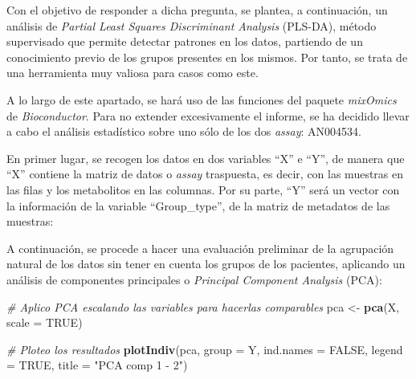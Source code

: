 \documentclass[
]{article}
\newenvironment{Shaded}{\begin{snugshade}}{\end{snugshade}}
\newcommand{\AttributeTok}[1]{\textcolor[rgb]{0.13,0.29,0.53}{#1}}
\newcommand{\CommentTok}[1]{\textcolor[rgb]{0.56,0.35,0.01}{\textit{#1}}}
\newcommand{\ConstantTok}[1]{\textcolor[rgb]{0.56,0.35,0.01}{#1}}
\newcommand{\FunctionTok}[1]{\textcolor[rgb]{0.13,0.29,0.53}{\textbf{#1}}}
\newcommand{\NormalTok}[1]{#1}
\newcommand{\OtherTok}[1]{\textcolor[rgb]{0.56,0.35,0.01}{#1}}
\newcommand{\SpecialCharTok}[1]{\textcolor[rgb]{0.81,0.36,0.00}{\textbf{#1}}}
\newcommand{\StringTok}[1]{\textcolor[rgb]{0.31,0.60,0.02}{#1}}
\begin{document}
Con el objetivo de responder a dicha pregunta, se plantea, a
continuación, un análisis de \emph{Partial Least Squares Discriminant
Analysis} (PLS-DA), método supervisado que permite detectar patrones en
los datos, partiendo de un conocimiento previo de los grupos presentes
en los mismos. Por tanto, se trata de una herramienta muy valiosa para
casos como este.

A lo largo de este apartado, se hará uso de las funciones del paquete
\emph{mixOmics} de \emph{Bioconductor}. Para no extender excesivamente
el informe, se ha decidido llevar a cabo el análisis estadístico sobre
uno sólo de los dos \emph{assay}: AN004534.

En primer lugar, se recogen los datos en dos variables ``X'' e ``Y'', de
manera que ``X'' contiene la matriz de datos o \emph{assay} traspuesta,
es decir, con las muestras en las filas y los metabolitos en las
columnas. Por su parte, ``Y'' será un vector con la información de la
variable ``Group\_type'', de la matriz de metadatos de las muestras:

\begin{Shaded}
\end{Shaded}

A continuación, se procede a hacer una evaluación preliminar de la
agrupación natural de los datos sin tener en cuenta los grupos de los
pacientes, aplicando un análisis de componentes principales o
\emph{Principal Component Analysis} (PCA):

\begin{Shaded}
\begin{Highlighting}[]
\CommentTok{\# Aplico PCA escalando las variables para hacerlas comparables}
\NormalTok{pca }\OtherTok{\textless{}{-}} \FunctionTok{pca}\NormalTok{(X, }\AttributeTok{scale =} \ConstantTok{TRUE}\NormalTok{)}

\CommentTok{\# Ploteo los resultados}
\FunctionTok{plotIndiv}\NormalTok{(pca, }\AttributeTok{group =}\NormalTok{ Y, }\AttributeTok{ind.names =} \ConstantTok{FALSE}\NormalTok{,}
          \AttributeTok{legend =} \ConstantTok{TRUE}\NormalTok{,}
          \AttributeTok{title =} \StringTok{"PCA comp 1 {-} 2"}\NormalTok{)}
\end{Highlighting}
\end{Shaded}
\end{document}

